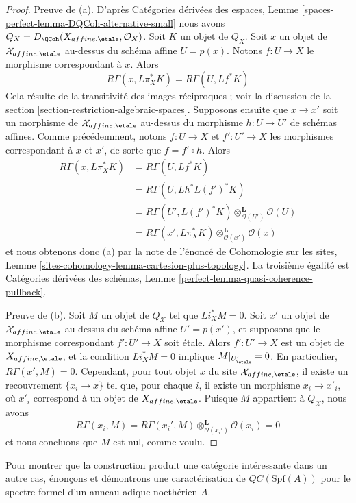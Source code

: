 \begin{proof}
\medskip\noindent
Preuve de (a). D'après Catégories dérivées des espaces, Lemme
\ref{spaces-perfect-lemma-DQCoh-alternative-small}
nous avons $Q_X = D_\QCoh(X_{affine, \etale}, \mathcal{O}_X)$.
Soit $K$ un objet de $Q_X$. Soit $x$ un objet de
$\mathcal{X}_{affine, \etale}$ au-dessus du schéma
affine $U = p(x)$. Notons $f : U \to X$ le morphisme correspondant
à $x$. Alors
$$
R\Gamma(x, L\pi_X^*K) = R\Gamma(U, Lf^*K)
$$
Cela résulte de la transitivité des images réciproques ; voir la discussion de la
section \ref{section-restriction-algebraic-spaces}.
Supposons ensuite que $x \to x'$ soit un morphisme de $\mathcal{X}_{affine, \etale}$
au-dessus du morphisme $h : U \to U'$ de schémas affines.
Comme précédemment, notons $f : U \to X$ et $f' : U' \to X$ les morphismes
correspondant à $x$ et $x'$, de sorte que $f = f' \circ h$.
Alors
\begin{align*}
R\Gamma(x, L\pi_X^*K)
& =
R\Gamma(U, Lf^*K) \\
& =
R\Gamma(U, Lh^*L(f')^*K) \\
& =
R\Gamma(U', L(f')^*K) \otimes_{\mathcal{O}(U')}^\mathbf{L} \mathcal{O}(U) \\
& =
R\Gamma(x', L\pi_X^*K) \otimes_{\mathcal{O}(x')}^\mathbf{L} \mathcal{O}(x)
\end{align*}
et nous obtenons donc (a) par la note de l'énoncé de
Cohomologie sur les sites, Lemme
\ref{sites-cohomology-lemma-cartesion-plus-topology}. La troisième égalité est
Catégories dérivées des schémas, Lemme
\ref{perfect-lemma-quasi-coherence-pullback}.

\medskip\noindent
Preuve de (b). Soit $M$ un objet de $Q_\mathcal{X}$
tel que $Li_X^*M = 0$. Soit $x'$ un objet de $\mathcal{X}_{affine, \etale}$
au-dessus du schéma affine $U' = p(x')$, et supposons que le morphisme
correspondant $f' : U' \to X$ soit \'etale. Alors $f' : U' \to X$ est un objet de
$X_{affine, \etale}$, et la condition $Li_X^*M = 0$ implique
$M|_{U'_\etale} = 0$. En particulier, $R\Gamma(x', M) = 0$.
Cependant, pour tout objet $x$ du site
$\mathcal{X}_{affine, \etale}$, il existe un recouvrement $\{x_i \to x\}$
tel que, pour chaque $i$, il existe un morphisme $x_i \to x'_i$, où
$x'_i$ correspond à un objet de $X_{affine, \etale}$.
Puisque $M$ appartient à $Q_\mathcal{X}$, nous avons
$$
R\Gamma(x_i, M) =
R\Gamma(x_i', M) \otimes_{\mathcal{O}(x_i')}^\mathbf{L} \mathcal{O}(x_i) =
0
$$
et nous concluons que $M$ est nul, comme voulu.
\end{proof}

\noindent
Pour montrer que la construction produit une catégorie intéressante dans un autre
cas, énonçons et démontrons une caractérisation de
$\mathit{QC}(\text{Spf}(A))$ pour le spectre formel d'un
anneau adique noethérien $A$.

